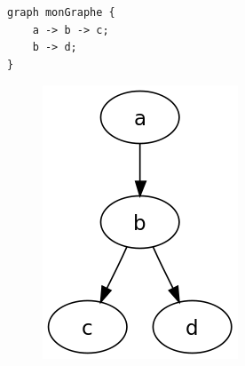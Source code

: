 \documentclass[12pt,a4paper]{report}
\begin{document}
\begin{lstlisting}
graph monGraphe {
    a -> b -> c;
    b -> d;
}
\end{lstlisting}

\begin{figure}[!h]
  \centering
  \includegraphics[scale=0.3]{ressources/grapheO.png}
\end{figure}
\end{document}
